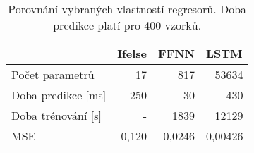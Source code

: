 \begin{table}[htbp]
  \centering
    \begin{tabular}{l|r|r|r}
    \toprule
          & \multicolumn{1}{l|}{Ifelse} & \multicolumn{1}{l|}{FFNN} & \multicolumn{1}{l}{LSTM} \\
    \midrule
    \midrule
    Počet parametrů & 17    & 817   & 53634 \\
    \midrule
    Doba predikce [ms] & 250   & 30    & 430 \\
    \midrule
    Doba trénování [s] & -     & 1839  & 12129 \\
    \midrule
    MSE   & 0,120 & 0,0246 & 0,00426 \\
    \bottomrule
    \bottomrule
    \end{tabular}%
    \caption[Porovnání regresorů]{Porovnání vybraných vlastností regresorů. Doba predikce platí pro 400 vzorků.}
  \label{tab:regr_comp}%
\end{table}%

